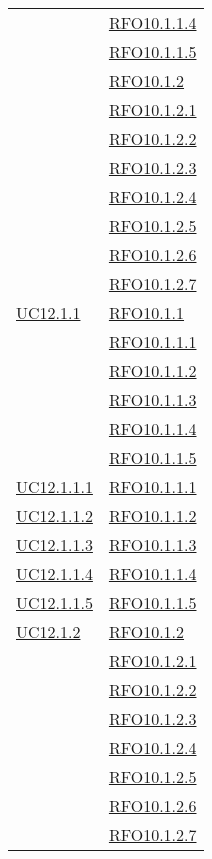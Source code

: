 \begin{longtable}{|>{\centering}m{5cm}|m{5cm}<{\centering}|}
& \hyperlink{RFO10.1.1.4}{RFO10.1.1.4}\\
& \hyperlink{RFO10.1.1.5}{RFO10.1.1.5}\\
& \hyperlink{RFO10.1.2}{RFO10.1.2}\\
& \hyperlink{RFO10.1.2.1}{RFO10.1.2.1}\\
& \hyperlink{RFO10.1.2.2}{RFO10.1.2.2}\\
& \hyperlink{RFO10.1.2.3}{RFO10.1.2.3}\\
& \hyperlink{RFO10.1.2.4}{RFO10.1.2.4}\\
& \hyperlink{RFO10.1.2.5}{RFO10.1.2.5}\\
& \hyperlink{RFO10.1.2.6}{RFO10.1.2.6}\\
& \hyperlink{RFO10.1.2.7}{RFO10.1.2.7}\\\hline
\hyperlink{UC12.1.1}{UC12.1.1} & \hyperlink{RFO10.1.1}{RFO10.1.1}\\
& \hyperlink{RFO10.1.1.1}{RFO10.1.1.1}\\
& \hyperlink{RFO10.1.1.2}{RFO10.1.1.2}\\
& \hyperlink{RFO10.1.1.3}{RFO10.1.1.3}\\
& \hyperlink{RFO10.1.1.4}{RFO10.1.1.4}\\
& \hyperlink{RFO10.1.1.5}{RFO10.1.1.5}\\\hline
\hyperlink{UC12.1.1.1}{UC12.1.1.1} & \hyperlink{RFO10.1.1.1}{RFO10.1.1.1}\\\hline
\hyperlink{UC12.1.1.2}{UC12.1.1.2} & \hyperlink{RFO10.1.1.2}{RFO10.1.1.2}\\\hline
\hyperlink{UC12.1.1.3}{UC12.1.1.3} & \hyperlink{RFO10.1.1.3}{RFO10.1.1.3}\\\hline
\hyperlink{UC12.1.1.4}{UC12.1.1.4} & \hyperlink{RFO10.1.1.4}{RFO10.1.1.4}\\\hline
\hyperlink{UC12.1.1.5}{UC12.1.1.5} & \hyperlink{RFO10.1.1.5}{RFO10.1.1.5}\\\hline
\hyperlink{UC12.1.2}{UC12.1.2} & \hyperlink{RFO10.1.2}{RFO10.1.2}\\
& \hyperlink{RFO10.1.2.1}{RFO10.1.2.1}\\
& \hyperlink{RFO10.1.2.2}{RFO10.1.2.2}\\
& \hyperlink{RFO10.1.2.3}{RFO10.1.2.3}\\
& \hyperlink{RFO10.1.2.4}{RFO10.1.2.4}\\
& \hyperlink{RFO10.1.2.5}{RFO10.1.2.5}\\
& \hyperlink{RFO10.1.2.6}{RFO10.1.2.6}\\
& \hyperlink{RFO10.1.2.7}{RFO10.1.2.7}\\

\end{longtable}
